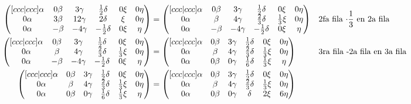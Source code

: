 \documentclass[letterpaper]{article}
\renewcommand{\*}{\cdot}
\theoremstyle{definition}
\begin{document}
		\begin{align*}
			\begin{pmatrix}[ccc|ccc]
			\alpha & 0\beta & 3\gamma & \frac{1}{2}\delta & 0\xi & 0\eta\\
			0\alpha & 3\beta & 12\gamma& 2\delta & \xi & 0\eta\\
			0\alpha & -\beta & -4\gamma & -\frac{1}{2}\delta & 0\xi & \eta
			\end{pmatrix} &= \begin{pmatrix}[ccc|ccc]
			\alpha & 0\beta & 3\gamma & \frac{1}{2}\delta & 0\xi & 0\eta\\
			0\alpha & \beta & 4\gamma& \frac{2}{3}\delta & \frac{1}{3}\xi & 0\eta\\
			0\alpha & -\beta & -4\gamma & -\frac{1}{2}\delta & 0\xi & \eta
			\end{pmatrix} &&  \text{2fa fila $ \* \dfrac{1}{3} $ en 2a fila}\\
			\begin{pmatrix}[ccc|ccc]
			\alpha & 0\beta & 3\gamma & \frac{1}{2}\delta & 0\xi & 0\eta\\
			0\alpha & \beta & 4\gamma& \frac{2}{3}\delta & \frac{1}{3}\xi & 0\eta\\
			0\alpha & -\beta & -4\gamma & -\frac{1}{2}\delta & 0\xi & \eta
			\end{pmatrix} &= \begin{pmatrix}[ccc|ccc]
			\alpha & 0\beta & 3\gamma & \frac{1}{2}\delta & 0\xi & 0\eta\\
			0\alpha & \beta & 4\gamma& \frac{2}{3}\delta & \frac{1}{3}\xi & 0\eta\\
			0\alpha & 0\beta & 0\gamma & \frac{1}{6}\delta & \frac{1}{3}\xi & \eta
			\end{pmatrix} && \text{3ra fila -2a fila en 3a fila}\\
			\begin{pmatrix}[ccc|ccc]
			\alpha & 0\beta & 3\gamma & \frac{1}{2}\delta & 0\xi & 0\eta\\
			0\alpha & \beta & 4\gamma& \frac{2}{3}\delta & \frac{1}{3}\xi & 0\eta\\
			0\alpha & 0\beta & 0\gamma & \frac{1}{6}\delta & \frac{1}{3}\xi & \eta
			\end{pmatrix} & = \begin{pmatrix}[ccc|ccc]
			\alpha & 0\beta & 3\gamma & \frac{1}{2}\delta & 0\xi & 0\eta\\
			0\alpha & \beta & 4\gamma& \frac{2}{3}\delta & \frac{1}{3}\xi & 0\eta\\
			0\alpha & 0\beta & 0\gamma & \delta & 2\xi & 6\eta

\end{pmatrix}
\end{align*}
\end{document}
